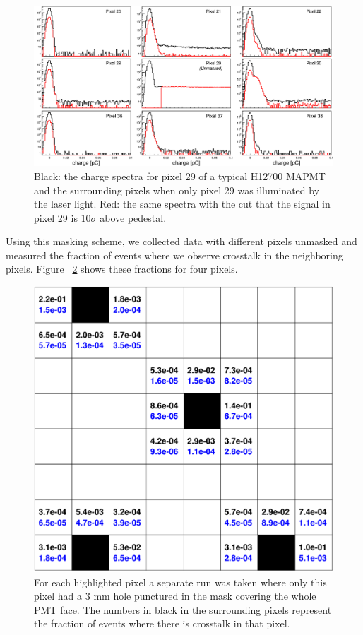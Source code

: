 \begin{figure}[h!bt] 
    \centering 
    \includegraphics[width=.9\textwidth,height=0.5\textwidth]{figures/H12700_3mm_mask_config5_ct_updated.png}
    \caption{Black: the charge spectra for pixel 29 of a typical H12700 MAPMT and the surrounding pixels when only pixel 29 was illuminated by the laser light. Red: the same spectra with the cut that the signal in pixel 29 is 10$\sigma$ above pedestal.}
    \label{fig:H12700pinhole}
\end{figure}

Using this masking scheme, we collected data with different pixels unmasked and measured the fraction of events where we observe crosstalk in the neighboring pixels. Figure ~\ref{fig:H12700_ct_ratio} shows these fractions for four pixels. 

\begin{figure}
	\centering
	\includegraphics[width=\linewidth]{figures/H12700_ct_ratio.png}
	\caption{For each highlighted pixel a separate run was taken where only this pixel had a 3 mm hole punctured in the mask covering the whole PMT face. The numbers in black in the surrounding pixels represent the fraction of events where there is crosstalk in that pixel.}
	\label{fig:H12700_ct_ratio}
\end{figure}

